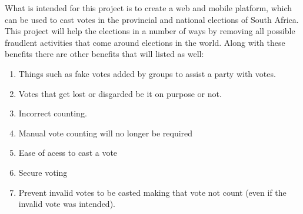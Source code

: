 What is intended for this project is to create a web and mobile platform, which can be used to cast votes in the provincial and national elections of South Africa. This project will help the elections in a number of ways by removing all possible fraudlent activities that come around elections in the world. Along with these benefits there are other benefits that will listed as well:
	
	\begin{enumerate}
		\item Things such as fake votes added by groups to assist a party with votes.
		\item Votes that get lost or disgarded be it on purpose or not.
		\item Incorrect counting.
		\item Manual vote counting will no longer be required
		\item Ease of acess to cast a vote
		\item Secure voting
		\item Prevent invalid votes to be casted making that vote not count (even if the invalid vote was intended).
	\end{enumerate}